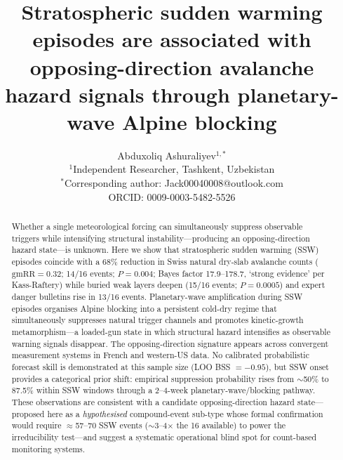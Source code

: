 \documentclass[11pt,letterpaper]{article}
\title{Stratospheric sudden warming episodes are associated with opposing-direction avalanche hazard signals through planetary-wave Alpine blocking}
\author{
    Abduxoliq Ashuraliyev$^{1,*}$
    \\[6pt]
    $^1$Independent Researcher, Tashkent, Uzbekistan\\[6pt]
    $^*$Corresponding author: Jack00040008@outlook.com\\[6pt]
    ORCID: 0009-0003-5482-5526
}
\date{}
\begin{document}
\maketitle
\thispagestyle{empty}

\begin{abstract}
Whether a single meteorological forcing can simultaneously suppress observable triggers while intensifying structural instability---producing an opposing-direction hazard state---is unknown. Here we show that stratospheric sudden warming (SSW) episodes coincide with a 68\% reduction in Swiss natural dry-slab avalanche counts ($\mathrm{gmRR} = 0.32$; 14/16 events; $P = 0.004$; Bayes factor 17.9--178.7, `strong evidence' per Kass-Raftery) while buried weak layers deepen (15/16 events; $P = 0.0005$) and expert danger bulletins rise in 13/16 events. Planetary-wave amplification during SSW episodes organises Alpine blocking into a persistent cold-dry regime that simultaneously suppresses natural trigger channels and promotes kinetic-growth metamorphism---a loaded-gun state in which structural hazard intensifies as observable warning signals disappear. The opposing-direction signature appears across convergent measurement systems in French and western-US data. No calibrated probabilistic forecast skill is demonstrated at this sample size (LOO BSS $= -0.95$), but SSW onset provides a categorical prior shift: empirical suppression probability rises from $\sim$50\% to 87.5\% within SSW windows through a 2--4-week planetary-wave/blocking pathway. These observations are consistent with a candidate opposing-direction hazard state---proposed here as a \emph{hypothesised} compound-event sub-type whose formal confirmation would require $\approx$57--70 SSW events ($\sim$3--4$\times$ the 16 available) to power the irreducibility test---and suggest a systematic operational blind spot for count-based monitoring systems.
\end{abstract}
\end{document}
